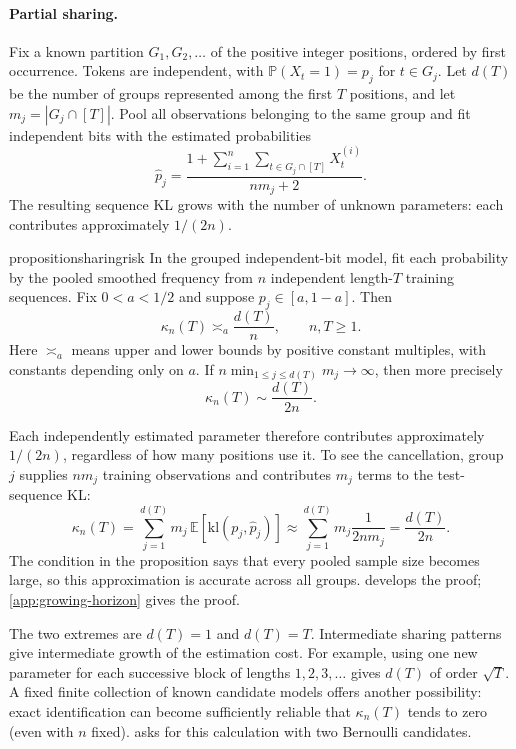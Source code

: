 \documentclass[11pt,twoside]{article}
\newcommand{\E}{\mathbb E}
\renewcommand{\P}{\mathbb P}
\newcommand{\kl}{\mathrm{kl}}
\theoremstyle{definition}
\theoremstyle{remark}
\begin{document}
\paragraph{Partial sharing.}
Fix a known partition \(G_1,G_2,\ldots\) of the positive integer
positions, ordered by first occurrence. Tokens are independent, with
\(\P(X_t=1)=p_j\) for \(t\in G_j\).
Let \(d(T)\) be the number of groups represented among the first \(T\)
positions, and let \(m_j=|G_j\cap[T]|\). Pool all observations belonging
to the same group and fit independent bits with the estimated probabilities
\begin{equation}
 \widehat p_j=
 \frac{1+\sum_{i=1}^n\sum_{t\in G_j\cap[T]}X_t^{(i)}}{nm_j+2}.
 \label{eq:pooled-frequency}
\end{equation}
The resulting sequence KL grows with the number of unknown parameters:
each contributes approximately \(1/(2n)\).

\begin{restatable}{proposition}{sharingrisk}
\label{prop:sharing-kl}
In the grouped independent-bit model, fit each probability by the pooled
smoothed frequency from \(n\) independent length-\(T\) training sequences.
Fix \(0<a<1/2\) and suppose \(p_j\in[a,1-a]\). Then
\begin{equation}
 \kappa_n(T)\asymp_a\frac{d(T)}n,\qquad n,T\ge1.
 \label{eq:sharing-rate}
\end{equation}
Here \(\asymp_a\) means upper and lower bounds by positive constant
multiples, with constants depending only on \(a\).
If \(n\min_{1\le j\le d(T)}m_j\to\infty\), then more precisely
\begin{equation}
 \kappa_n(T)\sim\frac{d(T)}{2n}.
 \label{eq:sharing-leading}
\end{equation}
\end{restatable}

Each independently estimated parameter therefore contributes approximately
\(1/(2n)\), regardless of how many positions use it.
To see the cancellation, group \(j\) supplies \(nm_j\) training
observations and contributes \(m_j\) terms to the test-sequence KL:
\[
 \kappa_n(T)=\sum_{j=1}^{d(T)}m_j\,\E[\kl(p_j,\widehat p_j)]
 \approx\sum_{j=1}^{d(T)}m_j\frac1{2nm_j}
 =\frac{d(T)}{2n}.
\]
The condition in the proposition says that every pooled sample size
becomes large, so this approximation is accurate across all groups.
 develops the proof;
\cref{app:growing-horizon} gives the proof.

The two extremes are \(d(T)=1\) and \(d(T)=T\).
Intermediate sharing patterns give intermediate growth of the
estimation cost. For example, using one new parameter for each
successive block of lengths \(1,2,3,\ldots\) gives
\(d(T)\) of order \(\sqrt T\).
A fixed finite collection of known candidate models offers another
possibility: exact identification can become sufficiently reliable
that \(\kappa_n(T)\) tends to zero (even with $n$ fixed).
 asks for this calculation with
two Bernoulli candidates.
\end{document}
